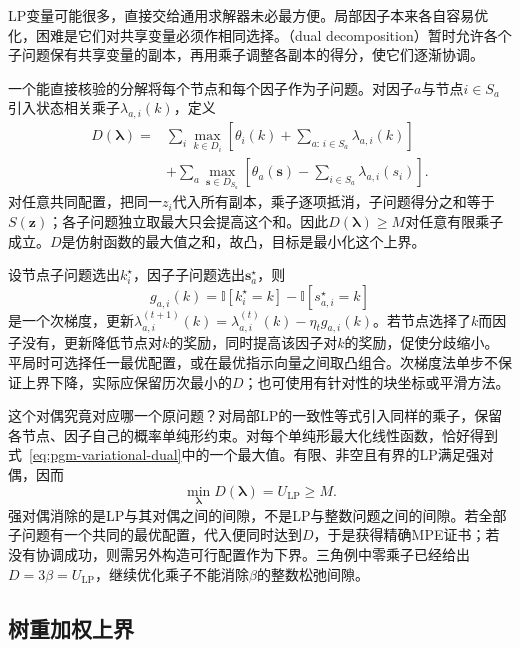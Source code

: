 LP变量可能很多，直接交给通用求解器未必最方便。局部因子本来各自容易优化，困难是它们对共享变量必须作相同选择。（dual decomposition）暂时允许各个子问题保有共享变量的副本，再用乘子调整各副本的得分，使它们逐渐协调。

一个能直接核验的分解将每个节点和每个因子作为子问题。对因子$a$与节点$i\in S_a$引入状态相关乘子$\lambda_{a,i}(k)$，定义
\begin{equation}
  \begin{aligned}
    D(\bm{\lambda})
       ={}&\sum_i\max_{k\in D_i}
          \left[\theta_i(k)+\sum_{a:\,i\in S_a}\lambda_{a,i}(k)\right]\\
        &+\sum_a\max_{\bm s\in D_{S_a}}
          \left[\theta_a(\bm s)-\sum_{i\in S_a}\lambda_{a,i}(s_i)\right].
  \end{aligned}
  \label{eq:pgm-variational-dual}
\end{equation}
对任意共同配置，把同一$z_i$代入所有副本，乘子逐项抵消，子问题得分之和等于$S(\bm z)$；各子问题独立取最大只会提高这个和。因此$D(\bm{\lambda})\geq M$对任意有限乘子成立。$D$是仿射函数的最大值之和，故凸，目标是最小化这个上界。

设节点子问题选出$k_i^\star$，因子子问题选出$\bm s_a^\star$，则
\[
  g_{a,i}(k)=\mathbb I[k_i^\star=k]-\mathbb I[s_{a,i}^\star=k]
\]
是一个次梯度，更新$\lambda_{a,i}^{(t+1)}(k)=\lambda_{a,i}^{(t)}(k)-\eta_t g_{a,i}(k)$。若节点选择了$k$而因子没有，更新降低节点对$k$的奖励，同时提高该因子对$k$的奖励，促使分歧缩小。平局时可选择任一最优配置，或在最优指示向量之间取凸组合。次梯度法单步不保证上界下降，实际应保留历次最小的$D$；也可使用有针对性的块坐标或平滑方法。

这个对偶究竟对应哪一个原问题？对局部LP的一致性等式引入同样的乘子，保留各节点、因子自己的概率单纯形约束。对每个单纯形最大化线性函数，恰好得到式~\eqref{eq:pgm-variational-dual}中的一个最大值。有限、非空且有界的LP满足强对偶，因而
\begin{equation}
  \min_{\bm{\lambda}}D(\bm{\lambda})=U_{\mathrm{LP}}\geq M.
  \label{eq:pgm-variational-dual-lp}
\end{equation}
强对偶消除的是LP与其对偶之间的间隙，不是LP与整数问题之间的间隙。若全部子问题有一个共同的最优配置，代入便同时达到$D$，于是获得精确MPE证书；若没有协调成功，则需另外构造可行配置作为下界。三角例中零乘子已经给出$D=3\beta=U_{\mathrm{LP}}$，继续优化乘子不能消除$\beta$的整数松弛间隙。

\subsection{树重加权上界}
\label{sec:pgm-variational-trw-mpe}

